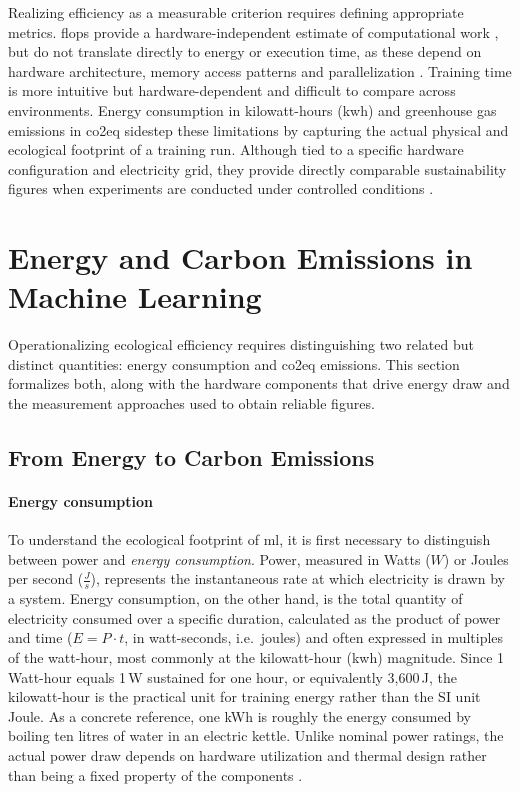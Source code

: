 Realizing efficiency as a measurable criterion requires defining appropriate metrics. \Glspl{flop} provide a hardware-independent estimate of computational work \parencite{schwartzGreenAI2020}, but do not translate directly to energy or execution time, as these depend on hardware architecture, memory access patterns and parallelization \parencite{hendersonSystematicReportingEnergy2020}. Training time is more intuitive but hardware-dependent and difficult to compare across environments. Energy consumption in kilowatt-hours (\gls{kwh}) and greenhouse gas emissions in \gls{co2eq} sidestep these limitations by capturing the actual physical and ecological footprint of a training run. Although tied to a specific hardware configuration and electricity grid, they provide directly comparable sustainability figures when experiments are conducted under controlled conditions \parencite{hendersonSystematicReportingEnergy2020, dodgeMeasuringCarbonIntensity2022}.

\section{Energy and Carbon Emissions in Machine Learning}
\label{sec:theoretical_emissions}

Operationalizing ecological efficiency requires distinguishing two related but distinct quantities: energy consumption and \gls{co2eq} emissions. This section formalizes both, along with the hardware components that drive energy draw and the measurement approaches used to obtain reliable figures.

\subsection{From Energy to Carbon Emissions}
\label{sec:theoretical_energy}

\paragraph{Energy consumption}
To understand the ecological footprint of \gls{ml}, it is first necessary to distinguish between power and \textit{energy consumption}. Power, measured in Watts ($W$) or Joules per second ($\frac{J}{s}$), represents the instantaneous rate at which electricity is drawn by a system. Energy consumption, on the other hand, is the total quantity of electricity consumed over a specific duration, calculated as the product of power and time ($E = P \cdot t$, in watt-seconds, i.e.\ joules) and often expressed in multiples of the watt-hour, most commonly at the kilowatt-hour (\gls{kwh}) magnitude. Since 1 Watt-hour equals 1\,W sustained for one hour, or equivalently 3{,}600\,J, the kilowatt-hour is the practical unit for training energy rather than the SI unit Joule. As a concrete reference, one kWh is roughly the energy consumed by boiling ten litres of water in an electric kettle. Unlike nominal power ratings, the actual power draw depends on hardware utilization and thermal design rather than being a fixed property of the components \parencite{hendersonSystematicReportingEnergy2020}.

